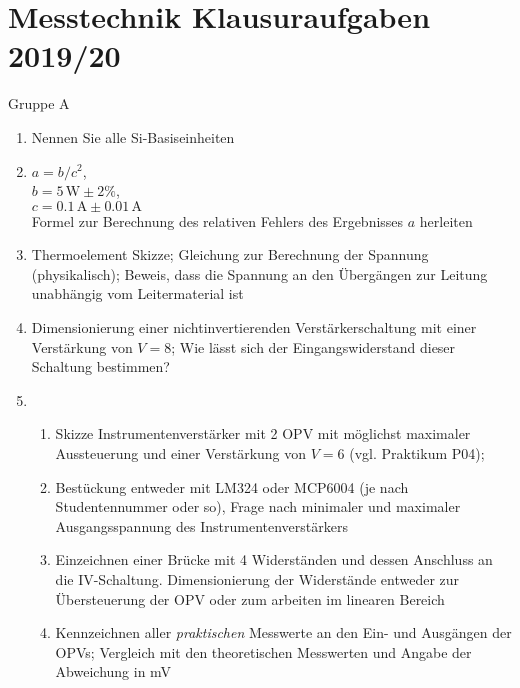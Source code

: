 \documentclass[a4paper, 12pt]{article}
\begin{document}
\section*{Messtechnik Klausuraufgaben 2019/20}
\vspace{-2ex}
{\Large Gruppe A \vspace{2ex}}


\begin{enumerate}

  \item Nennen Sie alle Si-Basiseinheiten

  \item $a=b/c^2$, \\$b = 5\, \si{\watt} \pm 2 \%$, \\$c = 0.1 \, \si{\ampere} \pm
    0.01 \, \si{\ampere}$\\ Formel zur Berechnung des relativen Fehlers des
    Ergebnisses $a$ herleiten 

  \item Thermoelement Skizze; Gleichung zur Berechnung der Spannung (physikalisch); Beweis,
    dass die Spannung an den Übergängen zur Leitung unabhängig vom Leitermaterial ist

  \item Dimensionierung einer nichtinvertierenden Verstärkerschaltung mit einer
    Verstärkung von $V=8$; Wie lässt sich der Eingangswiderstand dieser
    Schaltung bestimmen?

  \item \begin{enumerate}[label=(\alph*)] \item Skizze Instrumentenverstärker mit 2 OPV mit möglichst maximaler
      Aussteuerung und einer Verstärkung von $V=6$ (vgl. Praktikum P04);
      \item Bestückung entweder mit LM324 oder MCP6004 (je nach Studentennummer oder so), Frage
        nach minimaler und maximaler Ausgangsspannung des Instrumentenverstärkers
        \item Einzeichnen einer Brücke mit 4 Widerständen und dessen Anschluss an die
    IV-Schaltung. Dimensionierung der Widerstände entweder zur Übersteuerung der
    OPV oder zum arbeiten im linearen Bereich
     \item Kennzeichnen  aller \emph{praktischen} Messwerte an den Ein- und Ausgängen
    der OPVs; Vergleich mit den theoretischen Messwerten und Angabe der
    Abweichung in mV
    \end{enumerate}


\end{enumerate}
\end{document}

